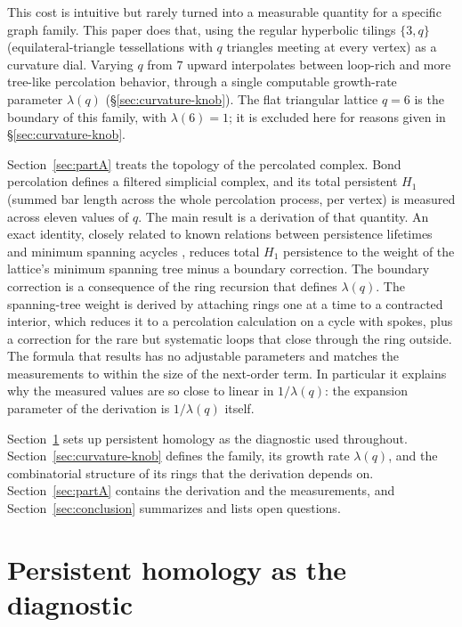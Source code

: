 \documentclass[11pt]{article}
\begin{document}
This cost is intuitive but rarely turned into a measurable quantity for a specific graph family. This paper does that, using the regular hyperbolic tilings $\{3,q\}$ (equilateral-triangle tessellations with $q$ triangles meeting at every vertex) as a curvature dial. Varying $q$ from $7$ upward interpolates between loop-rich and more tree-like percolation behavior, through a single computable growth-rate parameter $\lambda(q)$ (\S\ref{sec:curvature-knob}). The flat triangular lattice $q=6$ is the boundary of this family, with $\lambda(6)=1$; it is excluded here for reasons given in \S\ref{sec:curvature-knob}.

Section~\ref{sec:partA} treats the topology of the percolated complex. Bond percolation defines a filtered simplicial complex, and its total persistent $H_1$ (summed bar length across the whole percolation process, per vertex) is measured across eleven values of $q$. The main result is a derivation of that quantity. An exact identity, closely related to known relations between persistence lifetimes and minimum spanning acycles \citep{hiraoka2017,skraba2020}, reduces total $H_1$ persistence to the weight of the lattice's minimum spanning tree minus a boundary correction. The boundary correction is a consequence of the ring recursion that defines $\lambda(q)$. The spanning-tree weight is derived by attaching rings one at a time to a contracted interior, which reduces it to a percolation calculation on a cycle with spokes, plus a correction for the rare but systematic loops that close through the ring outside. The formula that results has no adjustable parameters and matches the measurements to within the size of the next-order term. In particular it explains why the measured values are so close to linear in $1/\lambda(q)$: the expansion parameter of the derivation is $1/\lambda(q)$ itself.

Section~\ref{sec:diagnostic} sets up persistent homology as the diagnostic used throughout. Section~\ref{sec:curvature-knob} defines the family, its growth rate $\lambda(q)$, and the combinatorial structure of its rings that the derivation depends on. Section~\ref{sec:partA} contains the derivation and the measurements, and Section~\ref{sec:conclusion} summarizes and lists open questions.

\section{Persistent homology as the diagnostic}
\label{sec:diagnostic}
\end{document}
